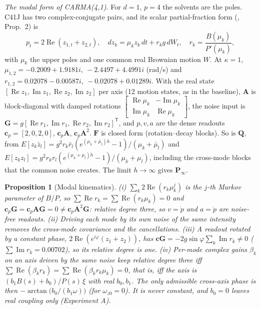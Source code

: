 \documentclass[conference]{IEEEtran}
\DeclareRobustCommand{\vct}[1]{\bm{#1}}
\DeclareRobustCommand{\mat}[1]{\bm{#1}}
\theoremstyle{bodysmall}
\newtheorem{proposition}{Proposition}
\begin{document}
\emph{The modal form of CARMA(4,1).} For $d=1$, $p=4$ the solvents are the
poles. C41J has two complex-conjugate pairs, and its scalar partial-fraction
form (\cite{brockwell11}, Prop.~2) is
\begin{equation}
p_t=2\operatorname{Re}(z_{1,t}+z_{2,t}),\quad
dz_k=\mu_kz_k\,dt+r_kg\,dW_t,\quad r_k=\frac{B(\mu_k)}{P'(\mu_k)},
\label{eq:modal}
\end{equation}
with $\mu_k$ the upper poles and one common real Brownian motion $W$. At
$\kappa=1$, $\mu_{1,2}=-0.2009+1.9181i,\ -2.4497+4.4991i$ (rad/s) and
$r_{1,2}=0.02078-0.00587i,\ -0.02078+0.01289i$. With the real state
$[\operatorname{Re}z_1,\operatorname{Im}z_1,\operatorname{Re}z_2,\operatorname{Im}z_2]$
per axis (12 motion states, as in the baseline), $\mat A$ is block-diagonal
with damped rotations
$\left[\begin{smallmatrix}\operatorname{Re}\mu_k&-\operatorname{Im}\mu_k\\
\operatorname{Im}\mu_k&\operatorname{Re}\mu_k\end{smallmatrix}\right]$, the
noise input is $\vct G=g[\operatorname{Re}r_1,\operatorname{Im}r_1,
\operatorname{Re}r_2,\operatorname{Im}r_2]^{\mathsf T}$, and $p,v,a$ are the
dense readouts $\vct c_p=[2,0,2,0]$, $\vct c_p\mat A$, $\vct c_p\mat A^2$.
$\mat F$ is closed form (rotation--decay blocks). So is $\mat Q$, from
$E[z_k\bar z_l]=g^2r_k\bar r_l(e^{(\mu_k+\bar\mu_l)h}-1)/(\mu_k+\bar\mu_l)$
and $E[z_kz_l]=g^2r_kr_l(e^{(\mu_k+\mu_l)h}-1)/(\mu_k+\mu_l)$, including
the cross-mode blocks that the common noise creates. The limit
$h\to\infty$ gives $\mat P_\infty$.
\begin{proposition}[Modal kinematics]
\label{prop:modal}
(i) $\sum_k2\operatorname{Re}(r_k\mu_k^j)$ is the $j$-th Markov parameter of
$B/P$, so $\sum\operatorname{Re}r_k=\sum\operatorname{Re}(r_k\mu_k)=0$ and
$\vct c_p\vct G=\vct c_p\mat A\vct G=0\neq\vct c_p\mat A^2\vct G$: relative
degree three, so $v=\dot p$ and $a=\ddot p$ are noise-free readouts.
(ii) Driving each mode by its own noise of the same intensity removes the
cross-mode covariance and the cancellations. (iii) A readout rotated by a
constant phase, $2\operatorname{Re}(e^{i\varphi}(z_1+z_2))$, has
$\vct c\vct G=-2g\sin\varphi\sum_k\operatorname{Im}r_k\neq0$
($\sum\operatorname{Im}r_k=0.00702$), so its relative degree is one.
(iv) Per-mode complex gains $\beta_k$ on an axis driven by the same noise
keep relative degree three iff
$\sum\operatorname{Re}(\beta_kr_k)=\sum\operatorname{Re}(\beta_kr_k\mu_k)=0$,
that is, iff the axis is $(b_1B(s)+b_0)/P(s)\,\xi$ with real $b_0,b_1$. The
only admissible cross-axis phase is then
$-\arctan\bigl(b_0/(b_1\omega)\bigr)$ (for $\omega_{z0}=0$). It is never
constant, and $b_0=0$ leaves real coupling only (Experiment A).
\end{proposition}
\end{document}
